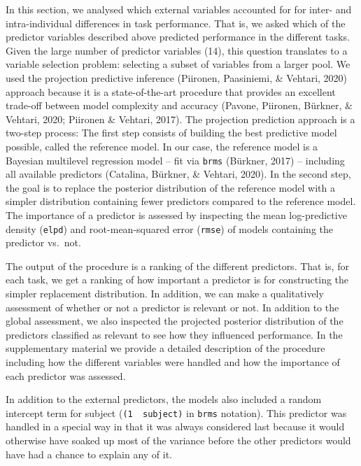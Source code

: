 \documentclass[
  man,floatsintext]{apa6}
\begin{document}
In this section, we analysed which external variables accounted for for inter- and intra-individual differences in task performance. That is, we asked which of the predictor variables described above predicted performance in the different tasks. Given the large number of predictor variables (14), this question translates to a variable selection problem: selecting a subset of variables from a larger pool. We used the projection predictive inference (Piironen, Paasiniemi, \& Vehtari, 2020) approach because it is a state-of-the-art procedure that provides an excellent trade-off between model complexity and accuracy (Pavone, Piironen, Bürkner, \& Vehtari, 2020; Piironen \& Vehtari, 2017). The projection prediction approach is a two-step process: The first step consists of building the best predictive model possible, called the reference model. In our case, the reference model is a Bayesian multilevel regression model -- fit via \texttt{brms} (Bürkner, 2017) -- including all available predictors (Catalina, Bürkner, \& Vehtari, 2020). In the second step, the goal is to replace the posterior distribution of the reference model with a simpler distribution containing fewer predictors compared to the reference model. The importance of a predictor is assessed by inspecting the mean log-predictive density (\texttt{elpd}) and root-mean-squared error (\texttt{rmse}) of models containing the predictor vs.~not.

The output of the procedure is a ranking of the different predictors. That is, for each task, we get a ranking of how important a predictor is for constructing the simpler replacement distribution. In addition, we can make a qualitatively assessment of whether or not a predictor is relevant or not. In addition to the global assessment, we also inspected the projected posterior distribution of the predictors classified as relevant to see how they influenced performance. In the supplementary material we provide a detailed description of the procedure including how the different variables were handled and how the importance of each predictor was assessed.

In addition to the external predictors, the models also included a random intercept term for subject (\texttt{(1\ \textbar{}\ subject)} in \texttt{brms} notation). This predictor was handled in a special way in that it was always considered last because it would otherwise have soaked up most of the variance before the other predictors would have had a chance to explain any of it.
\end{document}
